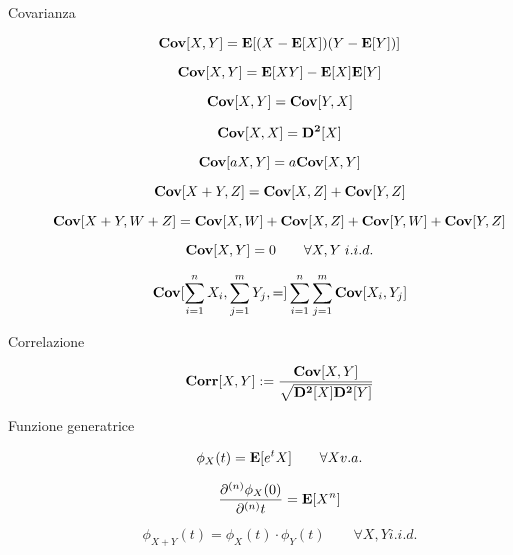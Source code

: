 \begin{description}
	\item [Covarianza]
		\begin{equation}
		\mathbf{Cov}[X,Y] = \mathbf{E}[(X-\mathbf{E}[X])(Y-\mathbf{E}[Y])]
		\end{equation}
		
		\begin{equation}
		\mathbf{Cov}[X,Y] = \mathbf{E}[XY]-\mathbf{E}[X]\mathbf{E}[Y]
		\end{equation}
		
		\begin{equation}
		\mathbf{Cov}[X,Y] = \mathbf{Cov}[Y,X]
		\end{equation}
		
		\begin{equation}
		\mathbf{Cov}[X,X] = \mathbf{D^{2}}[X]
		\end{equation}
		
		\begin{equation}
		\mathbf{Cov}[aX,Y] = a\mathbf{Cov}[X,Y]
		\end{equation}
		
		\begin{equation}
		\mathbf{Cov}[X+Y,Z] = \mathbf{Cov}[X,Z]+\mathbf{Cov}[Y,Z]
		\end{equation}
		
		\begin{equation}
		\mathbf{Cov}[X+Y,W+Z] = \mathbf{Cov}[X,W]+\mathbf{Cov}[X,Z]+\mathbf{Cov}[Y,W]+\mathbf{Cov}[Y,Z]
		\end{equation}
		
		\begin{equation}
		\mathbf{Cov}[X,Y] = 0 \qquad\forall X,Y \; i.i.d.
		\end{equation}
		
		\begin{equation}
		\mathbf{Cov}[\sum_{i=1}^{n}X_{i},\sum_{j=1}^{m}Y_{j},=] \sum_{i=1}^{n}\sum_{j=1}^{m}\mathbf{Cov}[X_{i},Y_{j}]
		\end{equation}
	
	\item [Correlazione]
		\begin{equation}
		\mathbf{Corr}[X,Y] := \frac{\mathbf{Cov}[X,Y]}{\sqrt{\mathbf{D^{2}}[X]\mathbf{D^{2}}[Y]}}
		\end{equation}
	
	\item [Funzione generatrice]
		\begin{equation}
		\phi_{X}(t) = \mathbf{E}[e^tX] \qquad\forall X v.a.
		\end{equation}
		
		\begin{equation}
		\frac{\partial^{(n)} \phi_{X}(0)}{\partial^{(n)}t} = \mathbf{E}[X^{n}]
		\end{equation}
		
		\begin{equation}
		\phi_{X+Y}(t) = \phi_{X}(t) \cdot \phi_{Y}(t) \qquad\forall X,Y i.i.d.
		\end{equation}
	
\end{description}
\newpage

